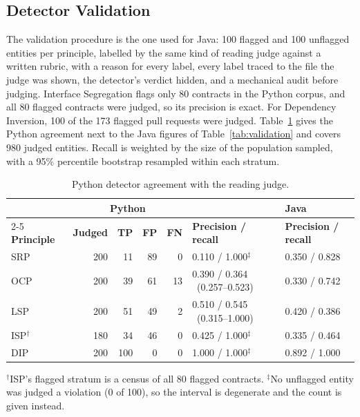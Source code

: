 \subsection{Detector Validation}
\label{sec:python-validation}

The validation procedure is the one used for Java: 100 flagged and 100 unflagged entities per
principle, labelled by the same kind of reading judge against a written rubric, with a reason for
every label, every label traced to the file the judge was shown, the detector's verdict hidden, and a
mechanical audit before judging. Interface Segregation flags only 80 contracts in the Python corpus,
and all 80 flagged contracts were judged, so its precision is exact. For Dependency Inversion, 100 of
the 173 flagged pull requests were judged. Table~\ref{tab:py-validation} gives the Python agreement next
to the Java figures of Table~\ref{tab:validation} and covers 980 judged entities. Recall is weighted by
the size of the population sampled, with a 95\% percentile bootstrap resampled within each stratum.

\begin{table}[htb]
\centering
\caption{Python detector agreement with the reading judge.}
\label{tab:py-validation}
\small
\begin{tabular}{@{}lrrrrll@{}}
\toprule
 & \multicolumn{4}{c}{\textbf{Python}} & & \textbf{Java} \\
\cmidrule(lr){2-5}
\textbf{Principle} & \textbf{Judged} & \textbf{TP} & \textbf{FP} & \textbf{FN} &
\textbf{Precision / recall} & \textbf{Precision / recall} \\
\midrule
SRP & 200 & 11 & 89 & 0 & 0.110 / 1.000$^\ddagger$ & 0.350 / 0.828 \\
OCP & 200 & 39 & 61 & 13 & 0.390 / 0.364 \ (0.257--0.523) & 0.330 / 0.742 \\
LSP & 200 & 51 & 49 & 2 & 0.510 / 0.545 \ (0.315--1.000) & 0.420 / 0.386 \\
ISP$^\dagger$ & 180 & 34 & 46 & 0 & 0.425 / 1.000$^\ddagger$ & 0.335 / 0.464 \\
DIP & 200 & 100 & 0 & 0 & 1.000 / 1.000$^\ddagger$ & 0.892 / 1.000 \\
\bottomrule
\end{tabular}

\vspace{4pt}
\footnotesize $^\dagger$ISP's flagged stratum is a census of all 80 flagged contracts.
$^\ddagger$No unflagged entity was judged a violation (0 of 100), so the interval is degenerate and
the count is given instead.
\end{table}


